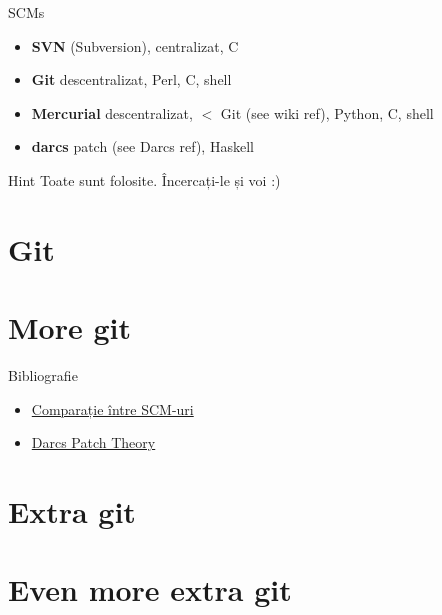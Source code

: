 \documentclass{beamer}
\begin{document}
\begin{frame}{SCMs}
  \begin{itemize}
    \item \textbf{SVN} (Subversion), centralizat, C
    \item \textbf{Git} descentralizat, Perl, C, shell
    \item \textbf{Mercurial} descentralizat, $<$ Git (see wiki ref), Python, C, shell
    \item \textbf{darcs} patch (see Darcs ref), Haskell
  \end{itemize}
  \pause
  \begin{alertblock}{Hint}
    Toate sunt folosite. Încercați-le și voi :)
  \end{alertblock}
\end{frame}

\section{Git}
\section{More git}

\begin{frame}{Bibliografie}
  \begin{itemize}
    \item \href{http://en.wikipedia.org/wiki/Comparison_of_revision_control_software}{Comparație între SCM-uri}
    \item \href{http://en.wikibooks.org/wiki/Understanding_Darcs/Patch_theory}{Darcs Patch Theory}
  \end{itemize}
\end{frame}

\section{Extra git}
\section{Even more extra git}

\end{document}
